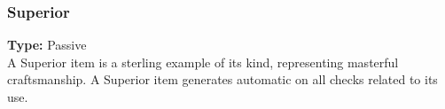 \subsubsection{Superior}
\label{iqty:superior}
\textbf{Type:} Passive\\
A Superior item is a sterling example of its kind,
representing masterful craftsmanship. A Superior item
generates automatic \advantage on all checks related to its use.

